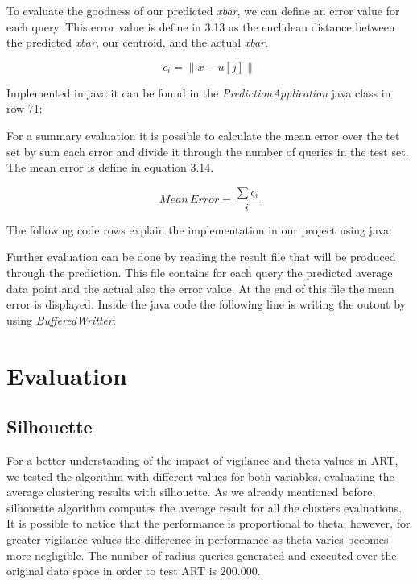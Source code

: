 \documentclass{lmproj}
\begin{document}
To evaluate the goodness of our predicted \textit{xbar}, we can define an error value for each query. This error value is define in 3.13 as the euclidean distance between the predicted \textit{xbar}, our centroid, and the actual \textit{xbar}.

\begin{equation}
	\epsilon_i = \parallel \bar{x} - u[j] \parallel 
\end{equation}

Implemented in java it can be found in the \textit{PredictionApplication} java class in row 71:



For a summary evaluation it is possible to calculate the mean error over the tet set by sum each error and divide it through the number of queries in the test set. The mean error is define in equation 3.14.

\begin{equation}
Mean\,Error= \frac{\sum\epsilon_i}{i}
\end{equation}

The following code rows explain the implementation in our project using java:



Further evaluation can be done by reading the result file that will be produced through the prediction. This file contains for each query the predicted average data point and the actual also the error value. At the end of this file the mean error is displayed. Inside the java code the following line is writing the outout by using \textit{BufferedWritter}:



\chapter{Evaluation}
\section{Silhouette}
For a better understanding of the impact of vigilance and theta values in ART, we tested the algorithm with different values for both variables, evaluating the average clustering results with silhouette. As we already mentioned before, silhouette algorithm computes the average result for all the clusters evaluations. It is possible to notice that the performance is proportional to theta; however, for greater vigilance values the difference in performance as theta varies becomes more negligible.
The number of radius queries generated and executed over the original data space in order to test ART is $200.000$.
\end{document}
